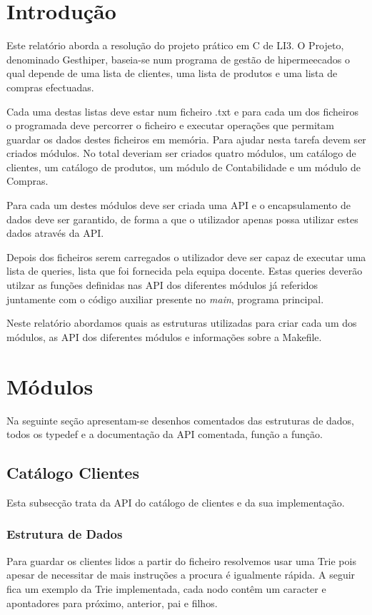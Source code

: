 \documentclass[10pt] {article}
\begin{document}
\section{Introdução}
\par Este relatório aborda a resolução do projeto prático em C de LI3. O Projeto, denominado Gesthiper, baseia-se
num programa de gestão de hipermeecados o qual depende de uma lista de clientes, uma lista de produtos e uma
lista de compras efectuadas. \par Cada uma destas listas deve estar num ficheiro .txt e para cada um dos ficheiros o
programada deve percorrer o ficheiro e executar operações que permitam guardar os dados destes
ficheiros em memória. Para ajudar nesta tarefa devem ser criados módulos. No total deveriam ser criados quatro
módulos, um catálogo de clientes, um catálogo de produtos, um módulo de Contabilidade e um módulo de Compras.
\par Para cada um destes módulos deve ser criada uma API e o encapsulamento de dados deve ser garantido, de
forma a que o utilizador apenas possa utilizar estes dados através da API.
\par Depois dos ficheiros serem carregados o utilizador deve ser capaz de executar uma lista de queries, lista que
foi fornecida pela equipa docente. Estas queries deverão utilzar as funções definidas nas API dos diferentes
módulos já referidos juntamente com o código auxiliar presente no \emph{main}, programa principal.
\par Neste relatório abordamos quais as estruturas utilizadas para criar cada um dos módulos, as API dos diferentes
módulos e informações sobre a Makefile.

\newpage
\section{Módulos}
Na seguinte seção apresentam-se desenhos comentados das estruturas de dados,
todos os typedef e a documentação da API comentada, função a função.


\subsection{Catálogo Clientes}
\par Esta subsecção trata da API do catálogo de clientes e da sua implementação.

\subsubsection{Estrutura de Dados}
\par
Para guardar os clientes lidos a partir do ficheiro resolvemos usar uma Trie pois apesar de
necessitar de mais instruções a procura é igualmente rápida. A seguir fica um exemplo da Trie implementada,
cada nodo contêm um caracter e apontadores para próximo, anterior, pai e filhos.
\end{document}
